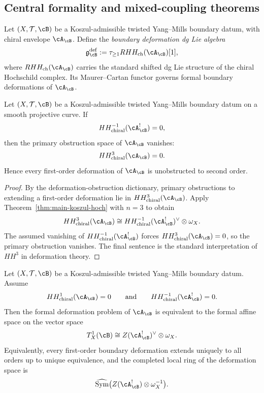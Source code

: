 \subsection{Central formality and mixed-coupling theorems}
\label{subsec:twisted-ym-central-formality}

\begin{definition}
\label{def:twisted-ym-def-dglie}
Let $(X,\mathcal{T},\cB)$ be a Koszul-admissible twisted Yang--Mills boundary datum, with chiral envelope $\cA_{\cB}$.  Define the \emph{boundary deformation dg Lie algebra}
\[
\mathfrak{g}^{\mathrm{def}}_{\cB}
:=
\tau_{\ge 1} RHH_{\mathrm{ch}}(\cA_{\cB})[1],
\]
where $RHH_{\mathrm{ch}}(\cA_{\cB})$ carries the standard shifted dg Lie structure of the chiral Hochschild complex.  Its Maurer--Cartan functor governs formal boundary deformations of $\cA_{\cB}$.
\end{definition}

\begin{theorem}
\label{thm:twisted-ym-dual-unobstructedness}
Let $(X,\mathcal{T},\cB)$ be a Koszul-admissible twisted Yang--Mills boundary datum on a smooth projective curve.  If
\[
HH^{-1}_{\mathrm{chiral}}(\cA_{\cB}^{!}) = 0,
\]
then the primary obstruction space of $\cA_{\cB}$ vanishes:
\[
HH^{3}_{\mathrm{chiral}}(\cA_{\cB}) = 0.
\]
Hence every first-order deformation of $\cA_{\cB}$ is unobstructed to second order.
\end{theorem}

\begin{proof}
By the deformation-obstruction dictionary, primary obstructions to extending a first-order deformation lie in $HH^{3}_{\mathrm{chiral}}(\cA_{\cB})$.  Apply Theorem~\ref{thm:main-koszul-hoch} with $n=3$ to obtain
\[
HH^{3}_{\mathrm{chiral}}(\cA_{\cB})
\cong
HH^{-1}_{\mathrm{chiral}}(\cA_{\cB}^{!})^{\vee}\otimes \omega_X.
\]
The assumed vanishing of $HH^{-1}_{\mathrm{chiral}}(\cA_{\cB}^{!})$ forces $HH^{3}_{\mathrm{chiral}}(\cA_{\cB})=0$, so the primary obstruction vanishes.  The final sentence is the standard interpretation of $HH^3$ in deformation theory.
\end{proof}

\begin{theorem}
\label{thm:twisted-ym-central-formality}
Let $(X,\mathcal{T},\cB)$ be a Koszul-admissible twisted Yang--Mills boundary datum.  Assume
\[
HH^{1}_{\mathrm{chiral}}(\cA_{\cB}) = 0
\qquad\text{and}\qquad
HH^{-1}_{\mathrm{chiral}}(\cA_{\cB}^{!}) = 0.
\]
Then the formal deformation problem of $\cA_{\cB}$ is equivalent to the formal affine space on the vector space
\[
T^1_X(\cB)
\cong
Z(\cA_{\cB}^{!})^{\vee}\otimes \omega_X.
\]
Equivalently, every first-order boundary deformation extends uniquely to all orders up to unique equivalence, and the completed local ring of the deformation space is
\[
\widehat{\mathrm{Sym}}\bigl(Z(\cA_{\cB}^{!})\otimes \omega_X^{-1}\bigr).
\]
\end{theorem}

